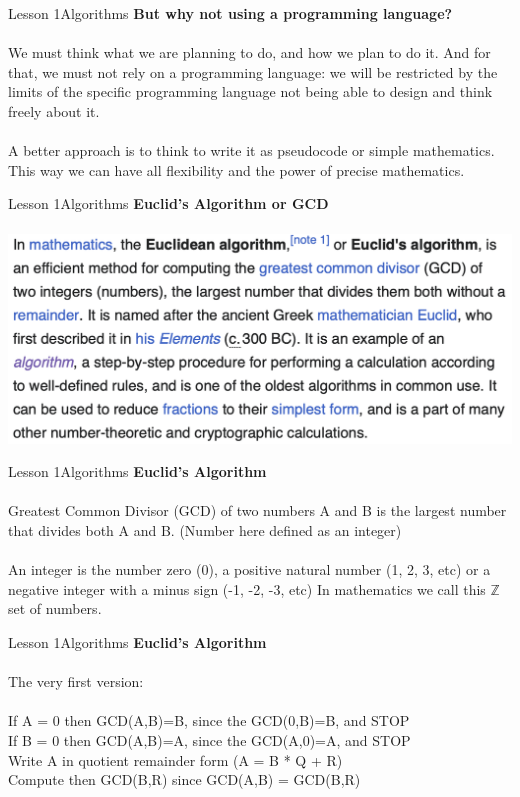\documentclass[aspectratio=1610]{beamer}
\begin{document}
\begin{frame}{Lesson 1}{Algorithms}
\Large
\textbf{But why not using a programming language?}\\~\\ 
We must think what we are planning to do, and how we plan to do it. And for that, we must not rely on a programming language: we will be restricted by the limits of the specific programming language not being able to design and think freely about it.\\~\\
A better approach is to think to write it as pseudocode or simple mathematics. This way we can have all flexibility and the power of precise mathematics.
\end{frame}



\begin{frame}{Lesson 1}{Algorithms}
\Large
\textbf{Euclid's Algorithm or GCD}\\~\\ 
\includegraphics[scale=0.7]{Images/gcd}
\end{frame}

\begin{frame}{Lesson 1}{Algorithms}
\Large
\textbf{Euclid's Algorithm}\\~\\ 
Greatest Common Divisor (GCD) of two numbers A and B is the largest number that divides both A and B. (Number here defined as an \alert{integer})\\~\\

An integer is the number zero (0), a positive natural number (1, 2, 3, etc) or a negative integer with a minus sign (-1, -2, -3, etc) In mathematics we call this \(\mathbb{Z}\) set of numbers.
\end{frame}


\begin{frame}{Lesson 1}{Algorithms}
\Large
\textbf{Euclid's Algorithm}\\~\\
The very first version:\\~\\ 
If A = 0 then GCD(A,B)=B, since the GCD(0,B)=B, and STOP\\  
If B = 0 then GCD(A,B)=A, since the GCD(A,0)=A, and STOP\\  
Write A in quotient remainder form (A = B * Q + R)\\
Compute then GCD(B,R) since GCD(A,B) = GCD(B,R)
\end{frame}
\end{document}
